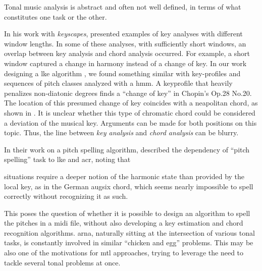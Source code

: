 

Tonal music analysis is abstract and often not well defined,
in terms of what constitutes one task or the other.


In his work with \emph{keyscapes},
\textcite{sapp2011computational} presented examples of key
analyses with different window lengths. In some of these
analyses, with sufficiently short windows, an overlap
between key analysis and chord analysis occurred. For
example, a short window captured a change in harmony instead
of a change of key. In our work designing a \gls{lke}
algorithm \parencite{napoleslopez2019keyfinding}, we found
something similar with key-profiles and sequences of pitch
classes analyzed with a \gls{hmm}. A \gls{keyprofile} that
heavily penalizes non-diatonic degrees finds a ``change of
key'' in Chopin's Op.28 No.20. The location of this presumed
change of key coincides with a \gls{neapolitan} chord, as
shown in . It is unclear whether this type
of chromatic chord could be considered a deviation of the
musical key. Arguments can be made for both positions on
this topic. Thus, the line between \emph{key analysis} and
\emph{chord analysis} can be blurry.



In their work on a pitch spelling algorithm,
\textcite{teodoru2007pitch} described the dependency of
``pitch spelling'' task to \gls{lke} and \gls{acr}, noting
that 

\begin{italicsquote}
 situations require a deeper notion of the
harmonic state than provided by the local key, as in the
German \gls{augsix} chord, which seems nearly impossible to
spell correctly without recognizing it as such.
\end{italicsquote}

This poses the question of whether it is possible to design
an algorithm to spell the pitches in a \gls{midi} file,
without also developing a key estimation and chord
recognition algorithms. \gls{arna}, naturally sitting at the
intersection of various tonal tasks, is constantly involved
in similar ``chicken and egg'' problems. This may be also
one of the motivations for \gls{mtl} approaches, trying to
leverage the need to tackle several tonal problems at once.
